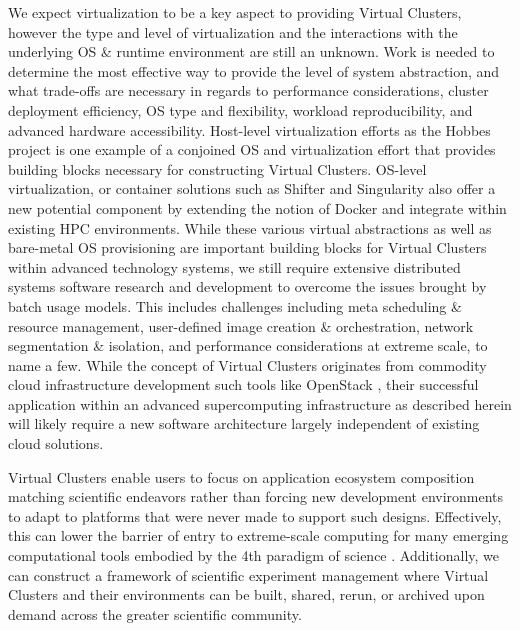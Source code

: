 We expect virtualization to be a key aspect to providing Virtual Clusters, however the type and level of virtualization and the interactions with the underlying OS \& runtime environment are still an unknown.  Work is needed to determine the most effective way to provide the level of system abstraction, and what trade-offs are necessary in regards to performance considerations, cluster deployment efficiency, OS type and flexibility, workload reproducibility, and advanced hardware accessibility.  Host-level virtualization efforts as the Hobbes project \cite{brightwell2013hobbes} is one example of a conjoined OS and virtualization effort that provides building blocks necessary for constructing Virtual Clusters.  OS-level virtualization, or container solutions such as Shifter \cite{jacobsen2015contain} and Singularity \cite{singularity} also offer a new potential component by extending the notion of Docker and integrate within existing HPC environments. While these various virtual abstractions as well as bare-metal OS provisioning are important building blocks for Virtual Clusters within advanced technology systems, we still require extensive distributed systems software research and development to overcome the issues brought by batch usage models. This includes challenges including meta scheduling \& resource management, user-defined image creation \& orchestration, network segmentation \& isolation, and performance considerations at extreme scale, to name a few.  While the concept of Virtual Clusters originates from commodity cloud infrastructure development such tools like OpenStack \cite{openstackhpc, Younge2015hpvc}, their successful application within an advanced supercomputing infrastructure as described herein will likely require a new software architecture largely independent of existing cloud solutions.  



Virtual Clusters enable users to focus on application ecosystem composition matching scientific endeavors rather than forcing new development environments to adapt to platforms that were never made to support such designs.  Effectively, this can lower the barrier of entry to extreme-scale computing for many emerging computational tools embodied by the 4th paradigm of science \cite{hey2009fourth}. Additionally, we can construct a framework of scientific experiment management where Virtual Clusters and their environments can be built, shared, rerun, or archived upon demand across the greater scientific community.










